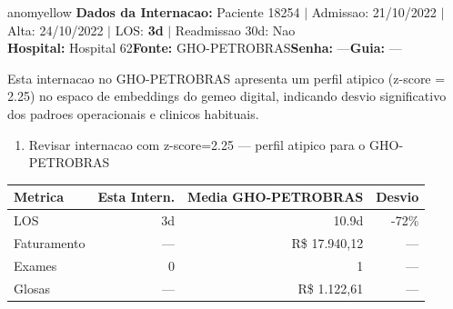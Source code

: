 \documentclass[a4paper,10pt]{article}
\begin{document}
\begin{anomalycard}[Internacao 24484 | GHO-PETROBRAS | MODERADO (z=2.25)]{anomyellow}
\textbf{Dados da Internacao:} Paciente 18254 $\mid$ Admissao: 21/10/2022 $\mid$ Alta: 24/10/2022 $\mid$ LOS: \textbf{3d} $\mid$ Readmissao 30d: Nao\\
\textbf{Hospital:} Hospital 62\quad\textbf{Fonte:} GHO-PETROBRAS\quad\textbf{Senha:} ---\quad\textbf{Guia:} ---\\
\vspace{2pt}\begin{tcolorbox}[colback=severityred!20,colframe=anomyellow,title={\textbf{Interpretacao de Negocio}},fonttitle=\bfseries\small,left=4pt,right=4pt,top=3pt,bottom=3pt]
{\small Esta internacao no GHO-PETROBRAS apresenta um perfil atipico (z-score = 2.25) no espaco de embeddings do gemeo digital, indicando desvio significativo dos padroes operacionais e clinicos habituais.}
\end{tcolorbox}
\begin{tcolorbox}[colback=severityyellow!30,colframe=anomorange,title={\textbf{Recomendacoes Especificas}},fonttitle=\bfseries\small,left=4pt,right=4pt,top=3pt,bottom=3pt]
\begin{enumerate}[nosep,leftmargin=16pt]
\item {\small Revisar internacao com z-score=2.25 --- perfil atipico para o GHO-PETROBRAS}
\end{enumerate}
\end{tcolorbox}
\begin{center}\begin{tabular}{l r r r}\toprule\textbf{Metrica} & \textbf{Esta Intern.} & \textbf{Media GHO-PETROBRAS} & \textbf{Desvio} \\\midrule
LOS & 3d & 10.9d & -72\% \\
Faturamento & --- & R\$ 17.940,12 & --- \\
Exames & 0 & 1 & --- \\
Glosas & --- & R\$ 1.122,61 & --- \\
\bottomrule\end{tabular}\end{center}


\end{anomalycard}
\end{document}

